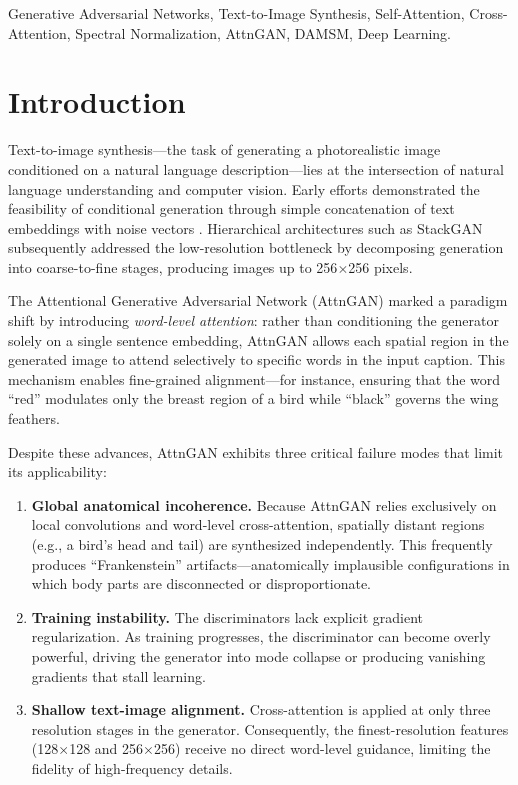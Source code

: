 \documentclass[conference]{IEEEtran}
\begin{document}
\begin{IEEEkeywords}
Generative Adversarial Networks, Text-to-Image Synthesis, Self-Attention, Cross-Attention, Spectral Normalization, AttnGAN, DAMSM, Deep Learning.
\end{IEEEkeywords}

\section{Introduction}
\label{sec:intro}

Text-to-image synthesis---the task of generating a photorealistic image conditioned on a natural language description---lies at the intersection of natural language understanding and computer vision. Early efforts demonstrated the feasibility of conditional generation through simple concatenation of text embeddings with noise vectors \cite{reed2016generative, mirza2014conditional}. Hierarchical architectures such as StackGAN \cite{zhang2017stackgan} subsequently addressed the low-resolution bottleneck by decomposing generation into coarse-to-fine stages, producing images up to 256$\times$256 pixels.

The Attentional Generative Adversarial Network (AttnGAN) \cite{xu2018attngan} marked a paradigm shift by introducing \emph{word-level attention}: rather than conditioning the generator solely on a single sentence embedding, AttnGAN allows each spatial region in the generated image to attend selectively to specific words in the input caption. This mechanism enables fine-grained alignment---for instance, ensuring that the word ``red'' modulates only the breast region of a bird while ``black'' governs the wing feathers.

Despite these advances, AttnGAN exhibits three critical failure modes that limit its applicability:

\begin{enumerate}
    \item \textbf{Global anatomical incoherence.} Because AttnGAN relies exclusively on local convolutions and word-level cross-attention, spatially distant regions (e.g., a bird's head and tail) are synthesized independently. This frequently produces ``Frankenstein'' artifacts---anatomically implausible configurations in which body parts are disconnected or disproportionate.
    \item \textbf{Training instability.} The discriminators lack explicit gradient regularization. As training progresses, the discriminator can become overly powerful, driving the generator into mode collapse or producing vanishing gradients that stall learning.
    \item \textbf{Shallow text-image alignment.} Cross-attention is applied at only three resolution stages in the generator. Consequently, the finest-resolution features (128$\times$128 and 256$\times$256) receive no direct word-level guidance, limiting the fidelity of high-frequency details.
\end{enumerate}
\end{document}
